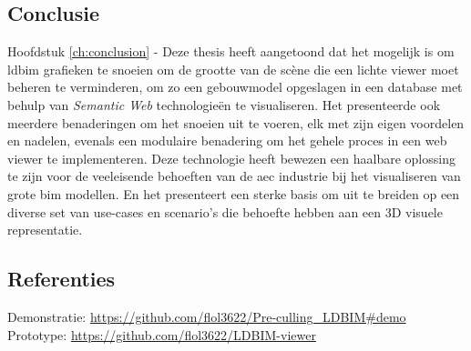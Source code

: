 \begin{refsection}
\begin{multicols}{2}
        \subsection*{Conclusie}
        \textsf{Hoofdstuk \ref{ch:conclusion} -} Deze thesis heeft aangetoond dat het mogelijk is om \ac{ldbim} grafieken te snoeien om de grootte van de scène die een lichte viewer moet beheren te verminderen, om zo een gebouwmodel opgeslagen in een database met behulp van \emph{Semantic Web} technologieën te visualiseren. Het presenteerde ook meerdere benaderingen om het snoeien uit te voeren, elk met zijn eigen voordelen en nadelen, evenals een modulaire benadering om het gehele proces in een web viewer te implementeren. Deze technologie heeft bewezen een haalbare oplossing te zijn voor de veeleisende behoeften van de \ac{aec} industrie bij het visualiseren van grote \ac{bim} modellen. En het presenteert een sterke basis om uit te breiden op een diverse set van use-cases en scenario's die behoefte hebben aan een 3D visuele representatie.

    \end{multicols}
    \subsection*{Referenties}
    \small
    {\renewcommand*{\bibfont}{\small}
        \printbibliography}

    \textsf{Demonstratie:} \url{https://github.com/flol3622/Pre-culling_LDBIM#demo}\\
    \textsf{Prototype:} \url{https://github.com/flol3622/LDBIM-viewer}
\end{refsection}
\restoregeometry
